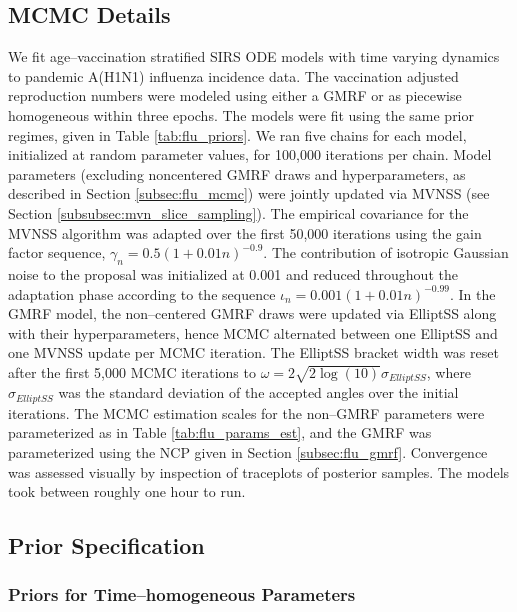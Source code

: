 \subsection{MCMC Details}
\label{subsec:flu_mcmc_details}
We fit age--vaccination stratified SIRS ODE models with time varying dynamics to pandemic A(H1N1) influenza incidence data. The vaccination adjusted reproduction numbers were modeled using either a GMRF or as piecewise homogeneous within three epochs. The models were fit using the same prior regimes, given in Table \ref{tab:flu_priors}. We ran five chains for each model, initialized at random parameter values, for 100,000 iterations per chain. Model parameters (excluding noncentered GMRF draws and hyperparameters, as described in Section \ref{subsec:flu_mcmc}) were jointly updated via MVNSS (see Section \ref{subsubsec:mvn_slice_sampling}). The empirical covariance for the MVNSS algorithm was adapted over the first 50,000 iterations using the gain factor sequence, $\gamma_n = 0.5(1 + 0.01n)^{-0.9}$. The contribution of isotropic Gaussian noise to the proposal was initialized at 0.001 and reduced throughout the adaptation phase according to the sequence $ \iota_n = 0.001(1 + 0.01n)^{-0.99} $. In the GMRF model, the non--centered GMRF draws were updated via ElliptSS along with their hyperparameters, hence MCMC alternated between one ElliptSS and one MVNSS update per MCMC iteration. The ElliptSS bracket width was reset after the first 5,000 MCMC iterations to $ \omega = 2\sqrt{2\log(10)}\sigma_{ElliptSS}$, where $ \sigma_{ElliptSS} $ was the standard deviation of the accepted angles over the initial iterations. The MCMC estimation scales for the non--GMRF parameters were parameterized as in Table \ref{tab:flu_params_est}, and the GMRF was parameterized using the NCP given in Section \ref{subsec:flu_gmrf}. Convergence was assessed visually by inspection of traceplots of posterior samples. The models took between roughly one hour to run.

\subsection{Prior Specification}
\label{subsec:flu_priors}

\subsubsection{Priors for Time--homogeneous Parameters}
\label{subsubsec:flu_param_priors_homog}

